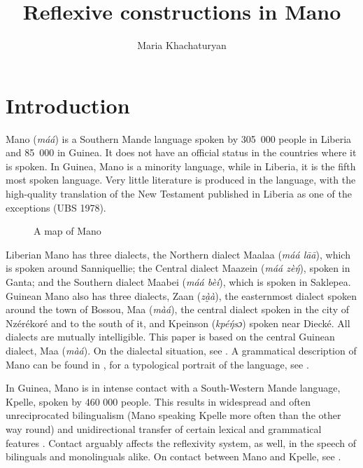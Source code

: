 \documentclass[output=paper]{langscibook}
\author{Maria Khachaturyan\affiliation{University of Helsinki}}
\title{Reflexive constructions in Mano}
\begin{document}
\maketitle

\section{Introduction}\label{sec:Kachaturyan:1}

Mano (\textit{máá}) is a Southern Mande language spoken by 305~000 people in Liberia and 85~000 in Guinea. It does not have an official status in the countries where it is spoken. In Guinea, Mano is a minority language, while in Liberia, it is the fifth most spoken language. Very little literature is produced in the language, with the high-quality translation of the New Testament published in Liberia as one of the exceptions (UBS 1978). 

\begin{figure}
\caption{A map of Mano}
\label{fig:Kachaturyan:1}
\end{figure}

Liberian Mano has three dialects, the Northern dialect Maalaa (\textit{máá lāā}), which is spoken around Sanniquellie; the Central dialect Maazein (\textit{máá zè\'{ŋ}}), spoken in Ganta; and the Southern dialect Maabei (\textit{máá bèí}), which is spoken in Saklepea. Guinean Mano also has three dialects, Zaan (\textit{zà̰à}), the easternmost dialect spoken around the town of Bossou, Maa (\textit{màá}), the central dialect spoken in the city of Nzérékoré and to the south of it, and Kpeinson (\textit{kpé\'{ŋ}sɔ}) spoken near Diecké. All dialects are mutually intelligible. This paper is based on the central Guinean dialect, Maa (\textit{màá}). On the dialectal situation, see \citet{Khachaturyan2018}. A grammatical description of Mano can be found in \citet{Khachaturyan2015}, for a typological portrait of the language, see \citet{KhachaturyanNodate2020}.

In Guinea, Mano is in intense contact with a South-Western Mande language, Kpelle, spoken by 460 000 people. This results in widespread and often unreciprocated bilingualism (Mano speaking Kpelle more often than the other way round) and unidirectional transfer of certain lexical \citep{KachaturyanNodate} and grammatical features \citep{Khachaturyan2019}. Contact arguably affects the reflexivity system, as well, in the speech of bilinguals and monolinguals alike. On contact between Mano and Kpelle, see \citet{KhachaturyanKonoshenkoToAppear}.
\end{document}
